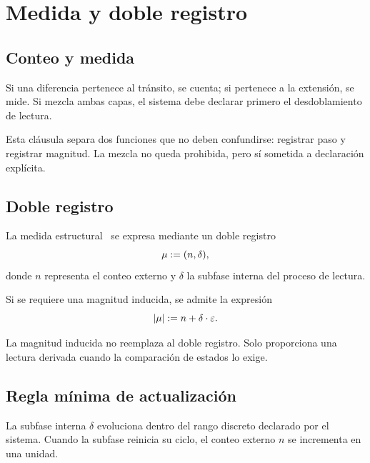 \chapter{Medida y doble registro}

\section{Conteo y medida}
\begin{definition}
Si una diferencia pertenece al tránsito, se cuenta; si pertenece a la extensión, se mide. Si mezcla ambas capas, el sistema debe declarar primero el desdoblamiento de lectura.
\end{definition}

\begin{observation}
Esta cláusula separa dos funciones que no deben confundirse: registrar paso y registrar magnitud. La mezcla no queda prohibida, pero sí sometida a declaración explícita.
\end{observation}

\section{Doble registro}
\begin{definition}
La medida estructural \Mmeas\ se expresa mediante un doble registro
\[
\mu := (n,\delta),
\]
donde \(n\) representa el conteo externo y \(\delta\) la subfase interna del proceso de lectura.
\end{definition}

\begin{definition}
Si se requiere una magnitud inducida, se admite la expresión
\[
|\mu| := n + \delta \cdot \varepsilon.
\]
\end{definition}

\begin{observation}
La magnitud inducida no reemplaza al doble registro. Solo proporciona una lectura derivada cuando la comparación de estados lo exige.
\end{observation}

\section{Regla mínima de actualización}
\begin{definition}
La subfase interna \(\delta\) evoluciona dentro del rango discreto declarado por el sistema. Cuando la subfase reinicia su ciclo, el conteo externo \(n\) se incrementa en una unidad.
\end{definition}

